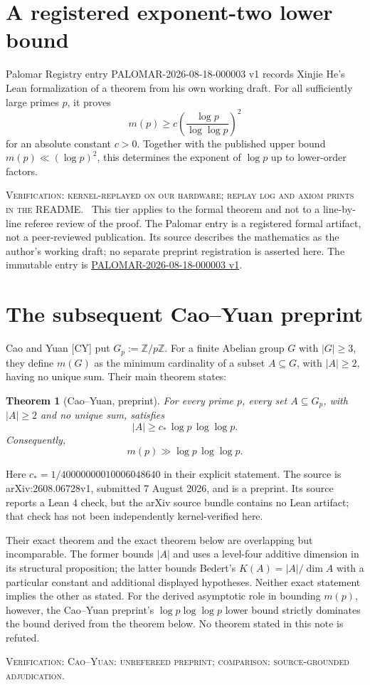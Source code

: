 \documentclass[10pt]{article}
\newcommand{\tier}[1]{\par\smallskip\noindent\textsc{Verification: #1.}\ }
\theoremstyle{plain}
\newtheorem*{theorem}{Theorem}
\begin{document}
\section{A registered exponent-two lower bound}

Palomar Registry entry PALOMAR-2026-08-18-000003 v1 records Xinjie He's Lean
formalization of a theorem from his own working draft. For all sufficiently
large primes $p$, it proves
\[
                 m(p)\geq c\left(\frac{\log p}{\log\log p}\right)^2
\]
for an absolute constant $c>0$. Together with the published upper bound
$m(p)\ll(\log p)^2$, this determines the exponent of $\log p$ up to lower-order
factors.

\tier{kernel-replayed on our hardware; replay log and axiom prints in the README}
This tier applies to the formal theorem and not to a line-by-line referee review
of the proof. The Palomar entry is a registered formal artifact, not a
peer-reviewed publication. Its source describes the mathematics as the author's
working draft; no separate preprint registration is asserted here. The immutable
entry is
\href{https://palomar-registry.org/entry?id=PALOMAR-2026-08-18-000003\&version=1}
{PALOMAR-2026-08-18-000003 v1}.

\section{The subsequent Cao--Yuan preprint}

Cao and Yuan [CY] put $G_p:=\mathbb Z/p\mathbb Z$. For a finite Abelian group
$G$ with $|G|\geq3$, they define $m(G)$ as the minimum cardinality of a subset
$A\subseteq G$, with $|A|\geq2$, having no unique sum. Their main theorem
states:
\begin{theorem}[Cao--Yuan, preprint]
For every prime $p$, every set $A\subseteq G_p$, with $|A|\geq2$ and no
unique sum, satisfies
\[
 |A|\geq c_*\,\log p\,\log\log p.
\]
Consequently,
\[
 m(p)\gg \log p\,\log\log p.
\]
\end{theorem}
Here $c_*=1/40000000010006048640$ in their explicit statement. The source is
arXiv:2608.06728v1, submitted 7 August 2026, and is a preprint. Its source
reports a Lean 4 check, but the arXiv source bundle contains no Lean artifact;
that check has not been independently kernel-verified here.

Their exact theorem and the exact theorem below are overlapping but
incomparable. The former bounds $|A|$ and uses a level-four additive dimension
in its structural proposition; the latter bounds Bedert's
$K(A)=|A|/\dim A$ with a particular constant and additional displayed
hypotheses. Neither exact statement implies the other as stated. For the
derived asymptotic role in bounding $m(p)$, however, the Cao--Yuan preprint's
$\log p\log\log p$ lower bound strictly dominates the bound derived from the
theorem below. No theorem stated in this note is refuted.
\tier{Cao--Yuan: unrefereed preprint; comparison: source-grounded adjudication}
\end{document}
